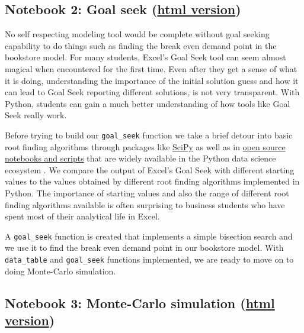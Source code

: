 \documentclass[ited,blindrev]{informs3}              %
\newcommand{\code}[1]{\texttt{#1}}
\begin{document}
\subsection{Notebook 2: Goal seek (\href{http://www.sba.oakland.edu/faculty/isken/excel_with_python/what_if_2_goalseek.html}{html version})}

No self respecting modeling tool would be complete without goal seeking capability to do things such as finding the break even demand point in the bookstore model. For many students, Excel's Goal Seek tool can seem almost magical when encountered for the first time. Even after they get a sense of what it is doing, understanding the importance of the initial solution guess and how it can lead to Goal Seek reporting different solutions, is not very transparent. With Python, students can gain a much better understanding of how tools like Goal Seek really work. 

Before trying to build our \code{goal\_seek} function we take a brief detour into basic root finding algorithms through packages like \href{https://docs.scipy.org/doc/scipy/tutorial/optimize.html#root-finding}{SciPy} \citep{2020SciPy-NMeth} as well as in \href{https://github.com/patrickwalls/mathematical-python/}{open source notebooks and scripts} that are widely available in the Python data science ecosystem \citep{wallsMathematicalPython2023}. We compare the output of Excel's Goal Seek with different starting values to the values obtained by different root finding algorithms implemented in Python. The importance of starting values and also the range of different root finding algorithms available is often surprising to business students who have spent most of their analytical life in Excel.

A \code{goal\_seek} function is created that implements a simple bisection search and we use it to find the break even demand point in our bookstore model. With \code{data\_table} and \code{goal\_seek} functions implemented, we are ready to move on to doing Monte-Carlo simulation.

\subsection{Notebook 3: Monte-Carlo simulation (\href{http://www.sba.oakland.edu/faculty/isken/excel_with_python/what_if_3_simulation.html}{html version})}
\end{document}
